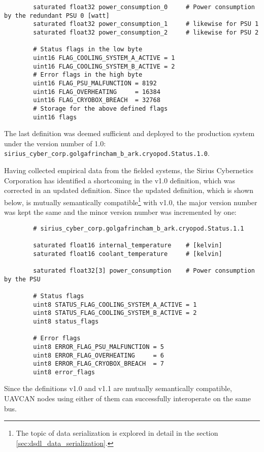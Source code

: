 \begin{remark}[breakable]
\begin{verbatim}
        saturated float32 power_consumption_0     # Power consumption by the redundant PSU 0 [watt]
        saturated float32 power_consumption_1     # likewise for PSU 1
        saturated float32 power_consumption_2     # likewise for PSU 2

        # Status flags in the low byte
        uint16 FLAG_COOLING_SYSTEM_A_ACTIVE = 1
        uint16 FLAG_COOLING_SYSTEM_B_ACTIVE = 2
        # Error flags in the high byte
        uint16 FLAG_PSU_MALFUNCTION = 8192
        uint16 FLAG_OVERHEATING     = 16384
        uint16 FLAG_CRYOBOX_BREACH  = 32768
        # Storage for the above defined flags
        uint16 flags
    \end{verbatim}

    The last definition was deemed sufficient and deployed to the production system
    under the version number of 1.0: \verb|sirius_cyber_corp.golgafrincham_b_ark.cryopod.Status.1.0|.

    Having collected empirical data from the fielded systems, the Sirius Cybernetics Corporation has
    identified a shortcoming in the v1.0 definition, which was corrected in an updated definition.
    Since the updated definition, which is shown below, is mutually semantically
    compatible\footnote{The topic of data serialization is explored in detail in the section
    \ref{sec:dsdl_data_serialization}.}
    with v1.0, the major version number was kept the same and the minor version number was incremented by one:

    \begin{verbatim}
        # sirius_cyber_corp.golgafrincham_b_ark.cryopod.Status.1.1

        saturated float16 internal_temperature    # [kelvin]
        saturated float16 coolant_temperature     # [kelvin]

        saturated float32[3] power_consumption    # Power consumption by the PSU

        # Status flags
        uint8 STATUS_FLAG_COOLING_SYSTEM_A_ACTIVE = 1
        uint8 STATUS_FLAG_COOLING_SYSTEM_B_ACTIVE = 2
        uint8 status_flags

        # Error flags
        uint8 ERROR_FLAG_PSU_MALFUNCTION = 5
        uint8 ERROR_FLAG_OVERHEATING     = 6
        uint8 ERROR_FLAG_CRYOBOX_BREACH  = 7
        uint8 error_flags
    \end{verbatim}

    Since the definitions v1.0 and v1.1 are mutually semantically compatible,
    UAVCAN nodes using either of them can successfully interoperate on the same bus.


\end{remark}
